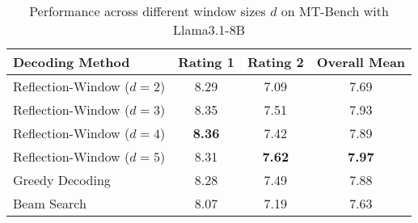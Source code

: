 \begin{table*}[t]
    \centering
    \caption{Performance across different window sizes $d$ on MT-Bench with Llama3.1-8B}
    \label{tab:llama31_mtbench_per_d}
    \begin{tabular}{lccc}
        \toprule
        \textbf{Decoding Method}  & \textbf{Rating 1} & \textbf{Rating 2} & \textbf{Overall Mean} \\
        \midrule
        Reflection-Window ($d=2$) & 8.29              & 7.09              & 7.69                  \\
        Reflection-Window ($d=3$) & 8.35              & 7.51              & 7.93                  \\
        Reflection-Window ($d=4$) & \textbf{8.36}     & 7.42              & 7.89                  \\
        Reflection-Window ($d=5$) & 8.31              & \textbf{7.62}     & \textbf{7.97}         \\
        Greedy Decoding           & 8.28              & 7.49              & 7.88                  \\
        Beam Search               & 8.07              & 7.19              & 7.63                  \\
        \bottomrule
    \end{tabular}
\end{table*}

